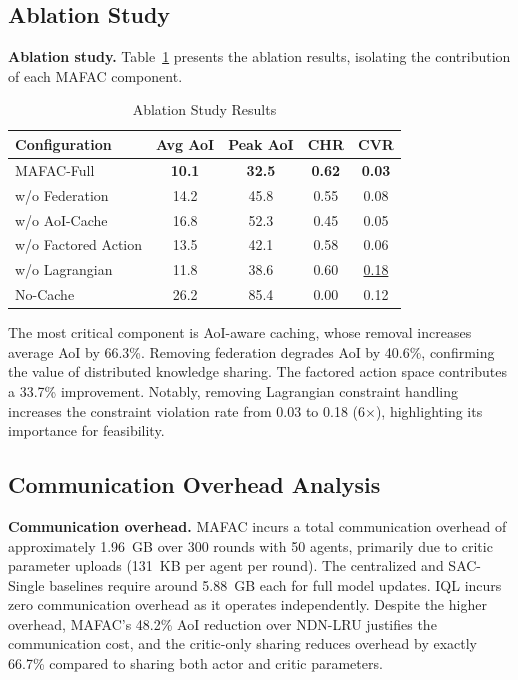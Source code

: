 \documentclass[journal]{IEEEtran}
\begin{document}
\subsection{Ablation Study} \label{sec.s3}

\textbf{Ablation study.} Table~\ref{tab:ablation} presents the ablation results, isolating the contribution of each MAFAC component.

\begin{table}[!t]
\centering
\caption{Ablation Study Results}
\label{tab:ablation}
\begin{tabular}{l c c c c}
\toprule
\textbf{Configuration} & \textbf{Avg AoI} & \textbf{Peak AoI} & \textbf{CHR} & \textbf{CVR} \\
\midrule
MAFAC-Full           & \textbf{10.1} & \textbf{32.5} & \textbf{0.62} & \textbf{0.03} \\
w/o Federation       & 14.2          & 45.8          & 0.55          & 0.08 \\
w/o AoI-Cache        & 16.8          & 52.3          & 0.45          & 0.05 \\
w/o Factored Action  & 13.5          & 42.1          & 0.58          & 0.06 \\
w/o Lagrangian       & 11.8          & 38.6          & 0.60          & \underline{0.18} \\
No-Cache             & 26.2          & 85.4          & 0.00          & 0.12 \\
\bottomrule
\end{tabular}
\end{table}

The most critical component is AoI-aware caching, whose removal increases average AoI by 66.3\%. Removing federation degrades AoI by 40.6\%, confirming the value of distributed knowledge sharing. The factored action space contributes a 33.7\% improvement. Notably, removing Lagrangian constraint handling increases the constraint violation rate from 0.03 to 0.18 (6$\times$), highlighting its importance for feasibility.

\subsection{Communication Overhead Analysis} \label{sec.s4}

\textbf{Communication overhead.} MAFAC incurs a total communication overhead of approximately 1.96~GB over 300 rounds with 50 agents, primarily due to critic parameter uploads (131~KB per agent per round). The centralized and SAC-Single baselines require around 5.88~GB each for full model updates. IQL incurs zero communication overhead as it operates independently. Despite the higher overhead, MAFAC's 48.2\% AoI reduction over NDN-LRU justifies the communication cost, and the critic-only sharing reduces overhead by exactly 66.7\% compared to sharing both actor and critic parameters.
\end{document}
